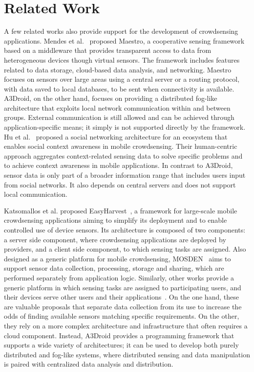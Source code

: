 \section{Related Work}
\label{sec:related}


A few related works also provide support for the development of crowdsensing applications. Mendes et al.~\cite{Mendes2015} proposed Maestro, a cooperative sensing framework based on a middleware that provides transparent access to data from heterogeneous devices though virtual sensors. The framework includes features related to data storage, cloud-based data analysis, and networking. Maestro focuses on sensors over large areas using a central server or a routing protocol, with data saved to local databases, to be sent when connectivity is available. A3Droid, on the other hand, focuses on providing a distributed fog-like architecture that exploits local network communication within and between groups. External communication is still allowed and can be achieved through application-specific means; it simply is not supported directly by the framework. Hu et al.~\cite{Hu:2014} proposed a social networking architecture for an ecosystem that enables social context awareness in mobile crowdsensing. Their human-centric approach aggregates context-related sensing data to solve specific problems and to achieve context awareness in mobile applications. In contrast to A3Droid, sensor data is only part of a broader information range that includes users input from social networks. It also depends on central servers and does not support local communication. 

Katsomallos et al. proposed EasyHarvest~\cite{Katsomallos:2014}, a framework for large-scale mobile crowdsensing applications aiming to simplify its deployment and to enable controlled use of device sensors. Its architecture is composed of two components: a server side component, where crowdsensing applications are deployed by providers, and a client side component, to which sensing tasks are assigned. Also designed as a generic platform for mobile crowdsensing, MOSDEN~\cite{Jayaraman:2013} aims to support sensor data collection, processing, storage and sharing, which are performed separately from application logic. Similarly, other works provide a generic platform in which sensing tasks are assigned to participating users, and their devices serve other users and their applications~\cite{Hu:2014, Bajaj:2015}. On the one hand, these are valuable proposals that separate data collection from its use to increase the odds of finding available sensors matching specific requirements. On the other, they rely on a more complex architecture and infrastructure that often requires a cloud component. Instead, A3Droid provides a programming framework that supports a wide variety of architectures; it can be used to develop both purely distributed and fog-like systems, where distributed sensing and data manipulation is paired with centralized data analysis and distribution.

